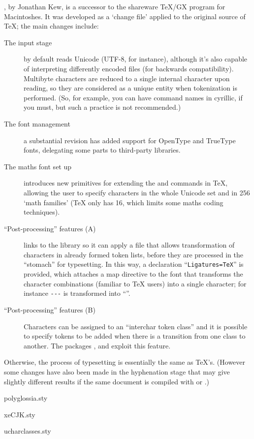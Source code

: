 \Question[Q-xetex]{\xetex{}}

\href{http://scripts.sil.org/xetex}{\xetex{}}, by Jonathan Kew, is a
successor to the shareware TeX/GX program for Macintoshes.  It was
developed as a  `change file' applied to the original source
of \TeX{}; the main changes include:
\begin{description}
\item[The input stage] \xetex{} by default reads Unicode (UTF-8, for
  instance), although it's also capable of interpreting differently
  encoded files (for backwards compatibility).  Multibyte characters
  are reduced to a single internal character upon reading, so they are
  considered as a unique entity when tokenization is performed.  (So,
  for example, you can have command names in cyrillic, if you must,
  but such a practice is not recommended.)
\item[The font management] a substantial revision has added support
  for OpenType and TrueType fonts, delegating some parts to
  third-party libraries.
\item[The maths font set up] \xetex{} introduces new primitives for
  extending the  and  commands in TeX,
  allowing the user to specify characters in the whole Unicode set and
  in 256 `math families' (\TeX{} only has 16, which limits some maths
  coding techniques).
\item[``Post-processing'' features (A)] \xetex{} links to the
   library so it can apply a  file
  that allows transformation of characters in already formed token
  lists, before they are processed in the ``stomach'' for typesetting.
  In this way, a declaration ``\texttt{Ligatures=TeX}'' is provided,
  which attaches a map directive to the font that transforms the
  character combinations (familiar to \TeX{} users) into a single
  character; for instance \texttt{-{}-{}-} is transformed into
  ``\textemdash''.
\item[``Post-processing'' features (B)] Characters can be assigned to
  an ``interchar token class'' and it is possible to specify tokens to
  be added when there is a transition from one class to another.  The
  packages ,  and
   exploit this feature.
\end{description}
Otherwise, the process of typesetting is essentially the same as
\TeX{}'s.  (However some changes have also been made in the
hyphenation stage that may give slightly different results if the same
document is compiled with \pdftex{} or \xetex{}.)
\begin{ctanrefs}
\item[polyglossia.sty]
\item[xeCJK.sty]
\item[ucharclasses.sty]
\end{ctanrefs}


